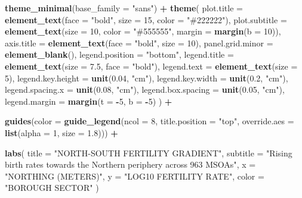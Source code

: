 \documentclass[
]{article}
\newenvironment{Shaded}{\begin{snugshade}}{\end{snugshade}}
\newcommand{\AttributeTok}[1]{\textcolor[rgb]{0.13,0.29,0.53}{#1}}
\newcommand{\DecValTok}[1]{\textcolor[rgb]{0.00,0.00,0.81}{#1}}
\newcommand{\FloatTok}[1]{\textcolor[rgb]{0.00,0.00,0.81}{#1}}
\newcommand{\FunctionTok}[1]{\textcolor[rgb]{0.13,0.29,0.53}{\textbf{#1}}}
\newcommand{\NormalTok}[1]{#1}
\newcommand{\SpecialCharTok}[1]{\textcolor[rgb]{0.81,0.36,0.00}{\textbf{#1}}}
\newcommand{\StringTok}[1]{\textcolor[rgb]{0.31,0.60,0.02}{#1}}
\begin{document}
\begin{Shaded}
\begin{Highlighting}[]
  \FunctionTok{theme\_minimal}\NormalTok{(}\AttributeTok{base\_family =} \StringTok{"sans"}\NormalTok{) }\SpecialCharTok{+}
  \FunctionTok{theme}\NormalTok{(}
    \AttributeTok{plot.title =} \FunctionTok{element\_text}\NormalTok{(}\AttributeTok{face =} \StringTok{"bold"}\NormalTok{, }\AttributeTok{size =} \DecValTok{15}\NormalTok{, }\AttributeTok{color =} \StringTok{"\#222222"}\NormalTok{),}
    \AttributeTok{plot.subtitle =} \FunctionTok{element\_text}\NormalTok{(}\AttributeTok{size =} \DecValTok{10}\NormalTok{, }\AttributeTok{color =} \StringTok{"\#555555"}\NormalTok{, }\AttributeTok{margin =} \FunctionTok{margin}\NormalTok{(}\AttributeTok{b =} \DecValTok{10}\NormalTok{)),}
    \AttributeTok{axis.title =} \FunctionTok{element\_text}\NormalTok{(}\AttributeTok{face =} \StringTok{"bold"}\NormalTok{, }\AttributeTok{size =} \DecValTok{10}\NormalTok{),}
    \AttributeTok{panel.grid.minor =} \FunctionTok{element\_blank}\NormalTok{(),}
    \AttributeTok{legend.position =} \StringTok{"bottom"}\NormalTok{,}
    \AttributeTok{legend.title =} \FunctionTok{element\_text}\NormalTok{(}\AttributeTok{size =} \FloatTok{7.5}\NormalTok{, }\AttributeTok{face =} \StringTok{"bold"}\NormalTok{),}
    \AttributeTok{legend.text =} \FunctionTok{element\_text}\NormalTok{(}\AttributeTok{size =} \DecValTok{5}\NormalTok{),}
    \AttributeTok{legend.key.height =} \FunctionTok{unit}\NormalTok{(}\FloatTok{0.04}\NormalTok{, }\StringTok{"cm"}\NormalTok{),}
    \AttributeTok{legend.key.width =} \FunctionTok{unit}\NormalTok{(}\FloatTok{0.2}\NormalTok{, }\StringTok{"cm"}\NormalTok{),}
    \AttributeTok{legend.spacing.x =} \FunctionTok{unit}\NormalTok{(}\FloatTok{0.08}\NormalTok{, }\StringTok{"cm"}\NormalTok{),}
    \AttributeTok{legend.box.spacing =} \FunctionTok{unit}\NormalTok{(}\FloatTok{0.05}\NormalTok{, }\StringTok{"cm"}\NormalTok{),}
    \AttributeTok{legend.margin =} \FunctionTok{margin}\NormalTok{(}\AttributeTok{t =} \SpecialCharTok{{-}}\DecValTok{5}\NormalTok{, }\AttributeTok{b =} \SpecialCharTok{{-}}\DecValTok{5}\NormalTok{)}
\NormalTok{  ) }\SpecialCharTok{+}

  \FunctionTok{guides}\NormalTok{(}\AttributeTok{color =} \FunctionTok{guide\_legend}\NormalTok{(}\AttributeTok{ncol =} \DecValTok{8}\NormalTok{, }\AttributeTok{title.position =} \StringTok{"top"}\NormalTok{,}
                              \AttributeTok{override.aes =} \FunctionTok{list}\NormalTok{(}\AttributeTok{alpha =} \DecValTok{1}\NormalTok{, }\AttributeTok{size =} \FloatTok{1.8}\NormalTok{))) }\SpecialCharTok{+}

  \FunctionTok{labs}\NormalTok{(}
    \AttributeTok{title =} \StringTok{"NORTH{-}SOUTH FERTILITY GRADIENT"}\NormalTok{,}
    \AttributeTok{subtitle =} \StringTok{"Rising birth rates towards the Northern periphery across 963 MSOAs"}\NormalTok{,}
    \AttributeTok{x =} \StringTok{"NORTHING (METERS)"}\NormalTok{,}
    \AttributeTok{y =} \StringTok{"LOG10 FERTILITY RATE"}\NormalTok{,}
    \AttributeTok{color =} \StringTok{"BOROUGH SECTOR"}
\NormalTok{  )}
\end{Highlighting}
\end{Shaded}
\end{document}
